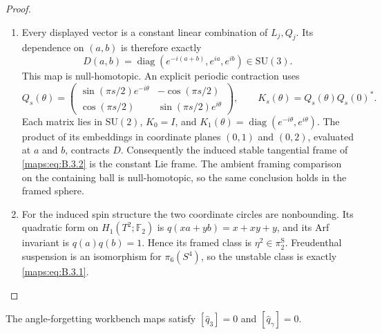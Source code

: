 \begin{proof}
\begin{enumerate}[label=\arabic*.,leftmargin=*]
\item Every displayed vector is a constant linear combination
of $L_j,Q_j$.  Its dependence on $(a,b)$ is therefore
exactly
\[
 D(a,b)=\operatorname{diag}(e^{-i(a+b)},e^{ia},e^{ib})
            \in\mathrm{SU}(3).
\]
This map is null-homotopic.  An explicit periodic
contraction uses
\[
 Q_s(\theta)=
 \begin{pmatrix}
 \sin(\pi s/2)e^{-i\theta}&-\cos(\pi s/2)\\
 \cos(\pi s/2)&\sin(\pi s/2)e^{i\theta}
 \end{pmatrix},
 \qquad K_s(\theta)=Q_s(\theta)Q_s(0)^*.
\]
Each matrix lies in $\mathrm{SU}(2)$,
$K_0=I$, and $K_1(\theta)=\operatorname{diag}
(e^{-i\theta},e^{i\theta})$.  The product of its
embeddings in coordinate planes $(0,1)$ and $(0,2)$,
evaluated at $a$ and $b$, contracts $D$.
Consequently the induced stable tangential frame of
\eqref{maps:eq:B.3.2} is the constant Lie frame.  The ambient framing
comparison on the containing ball is null-homotopic,
so the same conclusion holds in the framed sphere.

\item For the induced spin structure the two coordinate
circles are nonbounding.  Its quadratic form on
$H_1(T^2;\mathbb F_2)$ is
$q(xa+yb)=x+xy+y$, and its Arf invariant is
$q(a)q(b)=1$.  Hence its framed class is
$\eta^2\in\pi_2^{\mathrm S}$.  Freudenthal suspension
is an isomorphism for $\pi_6(S^4)$, so the unstable
class is exactly \eqref{maps:eq:B.3.1}.
\end{enumerate}
\end{proof}

\begin{theorem}\label{maps:src:B.3.2}


The angle-forgetting workbench maps satisfy
$[\widehat q_3]=0$ and $[\widehat q_\gamma]=0$.

\end{theorem}


